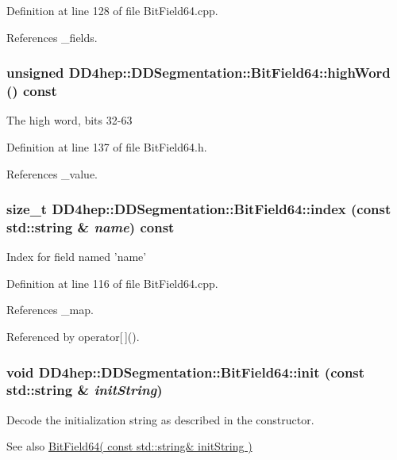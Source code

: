 Definition at line 128 of file BitField64.cpp.

References \_\-fields.\hypertarget{class_d_d4hep_1_1_d_d_segmentation_1_1_bit_field64_a1cfbecb4925f9198b07f64e53911b3ae}{
\subsubsection[{highWord}]{\setlength{\rightskip}{0pt plus 5cm}unsigned DD4hep::DDSegmentation::BitField64::highWord () const}}
\label{class_d_d4hep_1_1_d_d_segmentation_1_1_bit_field64_a1cfbecb4925f9198b07f64e53911b3ae}
The high word, bits 32-\/63 

Definition at line 137 of file BitField64.h.

References \_\-value.\hypertarget{class_d_d4hep_1_1_d_d_segmentation_1_1_bit_field64_a425e8216ef8608e969bdd6c30fd95588}{
\subsubsection[{index}]{\setlength{\rightskip}{0pt plus 5cm}size\_\-t DD4hep::DDSegmentation::BitField64::index (const std::string \& {\em name}) const}}
\label{class_d_d4hep_1_1_d_d_segmentation_1_1_bit_field64_a425e8216ef8608e969bdd6c30fd95588}
Index for field named 'name' 

Definition at line 116 of file BitField64.cpp.

References \_\-map.

Referenced by operator\mbox{[}$\,$\mbox{]}().\hypertarget{class_d_d4hep_1_1_d_d_segmentation_1_1_bit_field64_a05fc3d97d522cd5e1d7cf94483c89bc4}{
\subsubsection[{init}]{\setlength{\rightskip}{0pt plus 5cm}void DD4hep::DDSegmentation::BitField64::init (const std::string \& {\em initString})}}
\label{class_d_d4hep_1_1_d_d_segmentation_1_1_bit_field64_a05fc3d97d522cd5e1d7cf94483c89bc4}
Decode the initialization string as described in the constructor. \begin{DoxySeeAlso}{See also}
\hyperlink{class_d_d4hep_1_1_d_d_segmentation_1_1_bit_field64_aa958402b4d1f8d79cf716397b9b642e4}{BitField64( const std::string\& initString )} 
\end{DoxySeeAlso}


